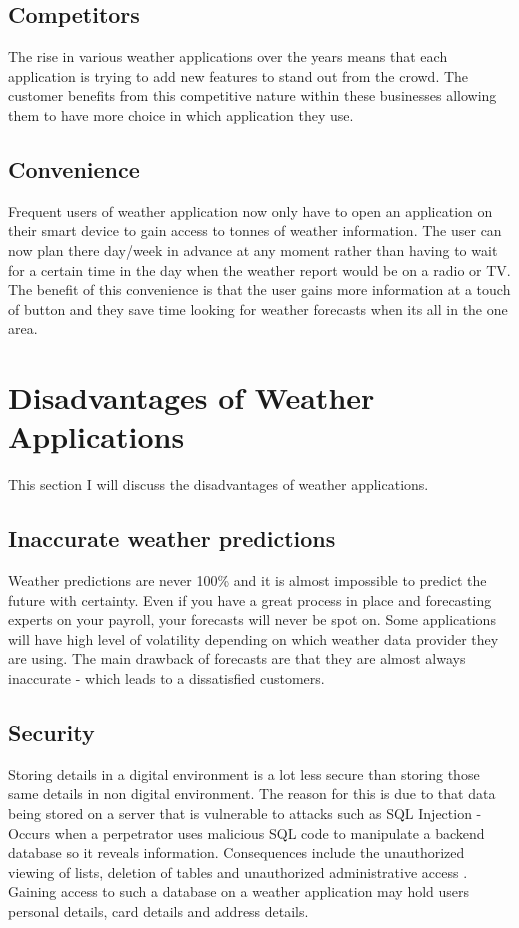\subsection{Competitors}

The rise in various weather applications over the years means that each application is trying to add new features to stand out from the crowd. The customer benefits from this competitive nature within these businesses allowing them to have more choice in which application they use. 
\subsection{Convenience}
Frequent users of weather application now only have to open an application on their smart device to gain access to tonnes of weather information. The user can now plan there day/week in advance at any moment rather than having to wait for a certain time in the day when the weather report would be on a radio or TV. The benefit of this convenience is that the user gains more information at a touch of button and they save time looking for weather forecasts when its all in the one area.

\section{Disadvantages of Weather Applications}
This section I will discuss the disadvantages of weather applications.

\subsection{Inaccurate weather predictions}

Weather predictions are never 100\% and it is almost impossible to predict the future with certainty. Even if you have a great process in place and forecasting experts on your payroll, your forecasts will never be spot on. Some applications will have high level of volatility depending on which weather data provider they are using. The main drawback of forecasts are that they are almost always inaccurate - which leads to a dissatisfied customers.

\subsection{Security}

Storing details in a digital environment is a lot less secure than storing those same details in non digital environment. The reason for this is due to that data being stored on a server that is vulnerable to attacks such as SQL Injection - Occurs when a perpetrator uses malicious SQL code to manipulate a backend database so it reveals information. Consequences include the unauthorized viewing of lists, deletion of tables and unauthorized administrative access \cite{sqlInjection}. Gaining access to such a database on a weather application may hold users personal details, card details and address details.

